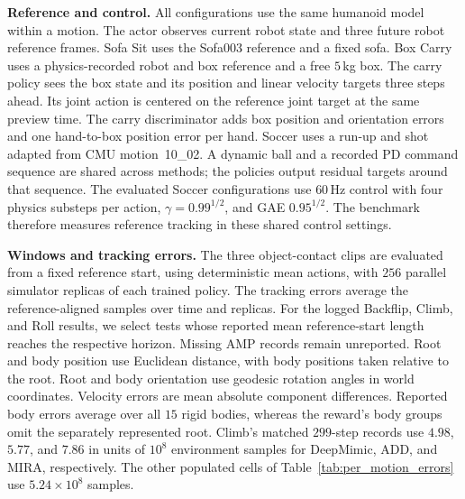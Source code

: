 \noindent\textbf{Reference and control.}
All configurations use the same humanoid model within a motion. The
actor observes current robot state and three future robot reference
frames. Sofa Sit uses the Sofa003 reference and a fixed sofa. Box Carry
uses a physics-recorded robot and box reference and a free $5$\,kg box.
The carry policy sees the box state and its position and linear velocity
targets three steps ahead. Its joint action is centered on the reference
joint target at the same preview time. The carry discriminator adds box
position and orientation errors and one hand-to-box position error per
hand. Soccer uses a run-up and shot adapted from CMU
motion~10\_02. A dynamic ball and a recorded PD command sequence are
shared across methods; the policies output residual targets around that
sequence. The evaluated Soccer configurations use $60\,\mathrm{Hz}$
control with four physics substeps per action, $\gamma=0.99^{1/2}$,
and GAE $0.95^{1/2}$.
The benchmark therefore measures reference tracking in these shared
control settings.

\medskip
\noindent\textbf{Windows and tracking errors.}
The three object-contact clips are evaluated from a fixed reference
start, using deterministic mean actions, with $256$ parallel simulator
replicas of each trained policy. The tracking errors average the
reference-aligned samples over time and replicas. For the logged
Backflip, Climb, and Roll results, we select tests whose reported mean
reference-start length reaches the respective horizon. Missing AMP
records remain unreported. Root and body position use Euclidean
distance, with body positions taken relative to the root. Root and body
orientation use geodesic rotation angles in world coordinates.
Velocity errors are mean absolute component differences. Reported body
errors average over all $15$ rigid bodies, whereas the reward's body
groups omit the separately represented root. Climb's matched
$299$-step records use $4.98$, $5.77$, and $7.86$ in units of $10^8$
environment samples for DeepMimic, ADD, and MIRA, respectively.
The other populated cells of Table~\ref{tab:per_motion_errors}
use $5.24\times10^8$ samples.

